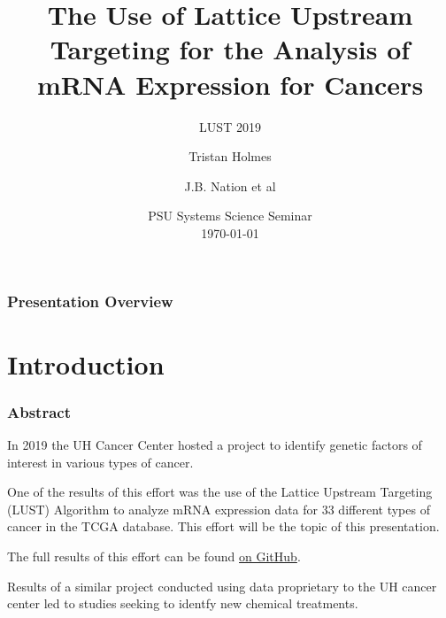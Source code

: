 \documentclass[
	11pt, %
]{beamer}
\title[LUST 2019]{The Use of Lattice Upstream Targeting for the Analysis of mRNA Expression for Cancers} %
\subtitle{LUST 2019} %
\author[Holmes \and Nation et al]{Tristan Holmes \and J.B. Nation et al} %
\institute[UH]{University of Hawaii at Manoa \\ \smallskip \textit{tristanh314@gmail.com}} %
\date[\today]{PSU Systems Science Seminar\\ \today} %
\begin{document}

\begin{frame}
	\titlepage
\end{frame}



\begin{frame}
	\frametitle{Presentation Overview}
	
	\tableofcontents
\end{frame}


\section{Introduction} 

\begin{frame}
	\frametitle{Abstract}
	
	In 2019 the UH Cancer Center hosted a project to identify genetic factors of interest in various types of cancer.
	\pause
	\bigskip 

	One of the results of this effort was the use of the Lattice Upstream Targeting (LUST) Algorithm to analyze mRNA expression data for 33 different types of cancer in the TCGA database. This effort will be the topic of this presentation.
	\pause
    \bigskip

    The full results of this effort can be found \href{https://github.com/tristanh314/lust-cancer-2019}{on GitHub}.
    \pause
	\bigskip 

    Results of a similar project conducted using data proprietary to the UH cancer center led to studies seeking to identfy new chemical treatments.
\end{frame}
\end{document}
